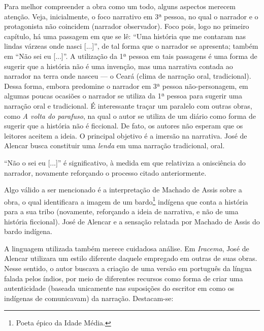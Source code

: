 \documentclass[12pt]{book}
\begin{document}
				\par Para melhor compreender a obra como um todo, alguns aspectos merecem atenção. Veja, inicialmente, o foco narrativo em 3ª pessoa, no qual o narrador e o protagonista não coincidem (narrador observador). Foco pois, logo no primeiro capítulo, há uma passagem em que se lê: ``Uma história que me contaram nas lindas várzeas onde nasci [...]'', de tal forma que o narrador se apresenta; também em ``Não sei eu [...]''. A utilização da 1ª pessoa em tais passagens é uma forma de sugerir que a história não é uma invenção, mas uma narrativa contada ao narrador na terra onde nasceu — o Ceará (clima de narração oral, tradicional). Dessa forma, embora predomine o narrador em 3ª pessoa não-personagem, em algumas poucas ocasiões o narrador se utiliza da 1ª pessoa para sugerir uma narração oral e tradicional. É interessante traçar um paralelo com outras obras, como \textit{A volta do parafuso}, na qual o autor se utiliza de um diário como forma de sugerir que a história não é ficcional. De fato, os autores não esperam que os leitores aceitem a ideia. O principal objetivo é a imersão na narrativa. José de Alencar busca constituir uma \textit{lenda} em uma narração tradicional, oral.
				\par ``Não o sei eu [...]'' é significativo, à medida em que relativiza a onisciência do narrador, novamente reforçando o processo citado anteriormente.
				\par Algo válido a ser mencionado é a interpretação de Machado de Assis sobre a obra, o qual identificara a imagem de um bardo\footnote{Poeta épico da Idade Média.} indígena que conta a história para a sua tribo (novamente, reforçando a ideia de narrativa, e não de uma história ficcional). José de Alencar e a sensação relatada por Machado de Assis do bardo indígena.
				\par A linguagem utilizada também merece cuidadosa análise. Em \textit{Iracema}, José de Alencar utilizara um estilo diferente daquele empregado em outras de suas obras. Nesse sentido, o autor buscava a criação de uma versão em português da língua falada pelos índios, por meio de diferentes recursos como forma de criar uma autenticidade (baseada unicamente nas suposições do escritor em como os indígenas de comunicavam) da narração. Destacam-se:
\end{document}
